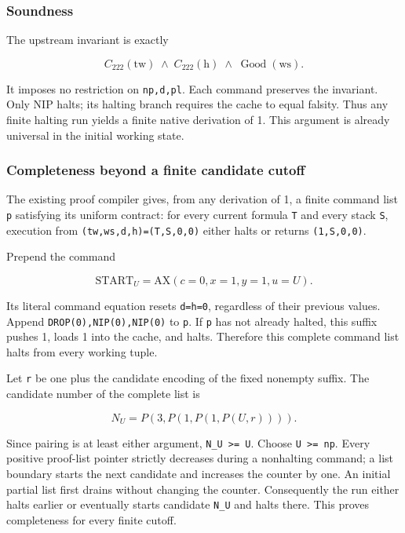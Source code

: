 \documentclass[
  11pt,
]{article}
\begin{document}
\hypertarget{soundness}{%
\subsubsection{Soundness}\label{soundness}}

The upstream invariant is exactly

\[
C_{222}(\mathrm{tw})\;\land\;C_{222}(\mathrm h)\;\land\;\operatorname{Good}(\mathrm{ws}).
\]

It imposes no restriction on \texttt{np,d,pl}. Each command preserves
the invariant. Only NIP halts; its halting branch requires the cache to
equal falsity. Thus any finite halting run yields a finite native
derivation of 1. This argument is already universal in the initial
working state.

\hypertarget{completeness-beyond-a-finite-candidate-cutoff}{%
\subsubsection{Completeness beyond a finite candidate
cutoff}\label{completeness-beyond-a-finite-candidate-cutoff}}

The existing proof compiler gives, from any derivation of 1, a finite
command list \texttt{p} satisfying its uniform contract: for every
current formula \texttt{T} and every stack \texttt{S}, execution from
\texttt{(tw,ws,d,h)=(T,S,0,0)} either halts or returns
\texttt{(1,S,0,0)}.

Prepend the command

\[
\mathrm{START}_U=\mathrm{AX}(c=0,x=1,y=1,u=U).
\]

Its literal command equation resets \texttt{d=h=0}, regardless of their
previous values. Append \texttt{DROP(0),NIP(0),NIP(0)} to \texttt{p}. If
\texttt{p} has not already halted, this suffix pushes 1, loads 1 into
the cache, and halts. Therefore this complete command list halts from
every working tuple.

Let \texttt{r} be one plus the candidate encoding of the fixed nonempty
suffix. The candidate number of the complete list is

\[
N_U=P(3,P(1,P(1,P(U,r)))).
\]

Since pairing is at least either argument,
\texttt{N\_U\ \textgreater{}=\ U}. Choose
\texttt{U\ \textgreater{}=\ np}. Every positive proof-list pointer
strictly decreases during a nonhalting command; a list boundary starts
the next candidate and increases the counter by one. An initial partial
list first drains without changing the counter. Consequently the run
either halts earlier or eventually starts candidate \texttt{N\_U} and
halts there. This proves completeness for every finite cutoff.
\end{document}
